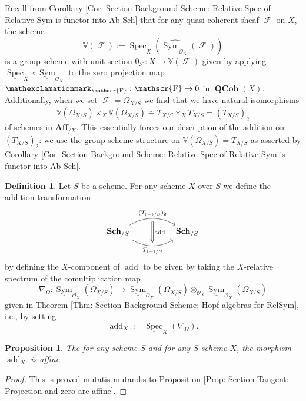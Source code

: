 \documentclass{amsart}
\newtheorem{proposition}[equation]{Proposition}
\theoremstyle{definition}
\newtheorem{definition}[equation]{Definition}
\DeclareMathOperator{\Fscr}{\mathscr{F}}
\DeclareMathOperator{\Ocal}{\mathcal{O}}
\newcommand{\bang}{\mathexclamationmark}
\DeclareMathOperator{\sym}{Sym}
\DeclareMathOperator{\Spec}{Spec}
\newcommand{\RelSpec}[1]{\underline{\Spec}_{#1}}
\newcommand{\RelSym}[1]{\underline{\sym}_{{#1}}}
\DeclareMathOperator{\Sch}{\mathbf{Sch}}
\DeclareMathOperator{\QCoh}{\mathbf{QCoh}}
\newcommand{\Kah}[2]{\Omega_{{#1}/{#2}}}
\numberwithin{equation}{subsection}
\begin{document}
Recall from Corollary \ref{Cor: Section Background Scheme: Relative Spec of Relative Sym is functor into Ab Sch} that for any quasi-coherent sheaf $\Fscr$ on $X$, the scheme
\[
\mathbb{V}(\Fscr) := \RelSpec{X}\left(\widehat{\RelSym{\Ocal_X}}(\Fscr)\right)
\]
is a group scheme with unit section $0_{\Fscr}:X \to \mathbb{V}(\Fscr)$ given by applying $\RelSpec{X} \circ \RelSym{\Ocal_X}$ to the zero projection map $\bang_{\Fscr}:\Fscr \to 0$ in $\QCoh(X)$. Additionally, when we set $\Fscr = \Kah{X}{S}$ we find that we have natural isomorphisms
\[
\mathbb{V}(\Kah{X}{S}) \times_X \mathbb{V}(\Kah{X}{S}) \cong T_{X/S} \times_X T_{X/S} = (T_{X/S})_2
\]
of schemes in $\mathbf{Aff}_{/X}$. This essentially forces our description of the addition on $(T_{X/S})_2$: we use the group scheme structure on $\mathbb{V}(\Kah{X}{S}) = T_{X/S}$ as asserted by Corollary \ref{Cor: Section Background Scheme: Relative Spec of Relative Sym is functor into Ab Sch}.
\begin{definition}\label{Defn: Section Tangent: The addition on the tangent bundle}
Let $S$ be a scheme. For any scheme $X$ over $S$ we define the addition transformation
\[
\begin{tikzcd}
\Sch_{/S} \ar[rr, bend left = 30, ""{name = U}]{}{(T_{(-)/S})_2} \ar[rr, swap, bend right = 30, ""{name = D}]{}{T_{(-)/S}} & & \Sch_{/S}
\ar[from = U, to = D, Rightarrow, shorten <= 4pt, shorten >= 4pt]{}{\operatorname{add}}
\end{tikzcd}
\]
by defining the $X$-component of $\operatorname{add}$ to be given by taking the $X$-relative spectrum of the comultiplication map 
\[
\nabla_{\Omega}:\RelSym{\Ocal_X}\left(\Kah{X}{S}\right) \longrightarrow \RelSym{\Ocal_X}\left(\Kah{X}{S}\right) \otimes_{\Ocal_X} \RelSym{\Ocal_X}\left(\Kah{X}{S}\right)
\] 
given in Theorem \ref{Thm: Section Background Scheme: Hopf algebras for RelSym}, i.e., by setting
\[
\operatorname{add}_X := \RelSpec{X}(\nabla_{\Omega}).
\]
\end{definition}
\begin{proposition}\label{Prop: Section Tangent: Affine addition map}
The for any scheme $S$ and for any $S$-scheme $X$, the morphism $\operatorname{add}_X$ is affine.
\end{proposition}
\begin{proof}
This is proved mutatis mutandis to Proposition \ref{Prop: Section Tangent: Projection and zero are affine}.
\end{proof}
\end{document}

